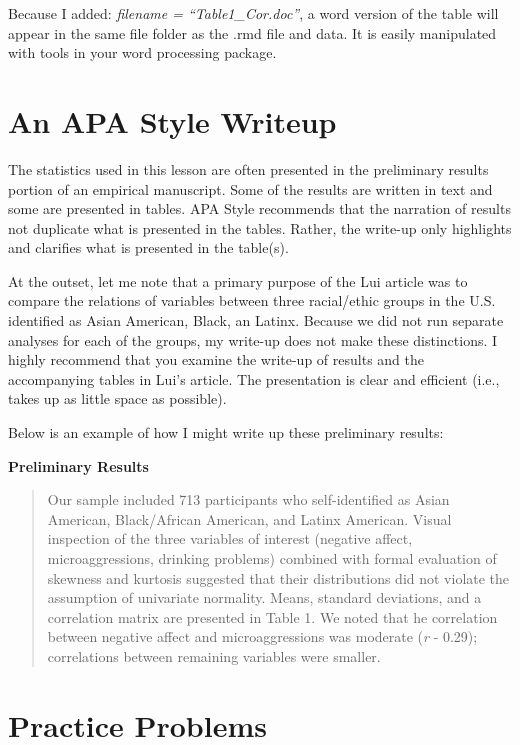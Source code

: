 \documentclass[
  11pt,
]{book}
\begin{document}
Because I added: \emph{filename = ``Table1\_Cor.doc''}, a word version of the table will appear in the same file folder as the .rmd file and data. It is easily manipulated with tools in your word processing package.

\hypertarget{an-apa-style-writeup}{%
\section{An APA Style Writeup}\label{an-apa-style-writeup}}

The statistics used in this lesson are often presented in the preliminary results portion of an empirical manuscript. Some of the results are written in text and some are presented in tables. APA Style recommends that the narration of results not duplicate what is presented in the tables. Rather, the write-up only highlights and clarifies what is presented in the table(s).

At the outset, let me note that a primary purpose of the Lui \citeyearpar{lui_racial_2020} article was to compare the relations of variables between three racial/ethic groups in the U.S. identified as Asian American, Black, an Latinx. Because we did not run separate analyses for each of the groups, my write-up does not make these distinctions. I highly recommend that you examine the write-up of results and the accompanying tables in Lui's article. The presentation is clear and efficient (i.e., takes up as little space as possible).

Below is an example of how I might write up these preliminary results:

\textbf{Preliminary Results}

\begin{quote}
Our sample included 713 participants who self-identified as Asian American, Black/African American, and Latinx American. Visual inspection of the three variables of interest (negative affect, microaggressions, drinking problems) combined with formal evaluation of skewness and kurtosis suggested that their distributions did not violate the assumption of univariate normality. Means, standard deviations, and a correlation matrix are presented in Table 1. We noted that he correlation between negative affect and microaggressions was moderate (\emph{r} - 0.29); correlations between remaining variables were smaller.
\end{quote}

\hypertarget{practice-problems}{%
\section{Practice Problems}\label{practice-problems}}
\end{document}
